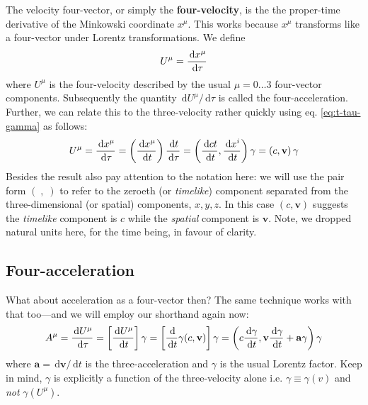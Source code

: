 \documentclass[english,seminar]{lecture}
\newcommand{\diff}{\,\textrm{d}}
\begin{document}
The velocity four-vector, or simply the \textbf{four-velocity}, is the the proper-time derivative of the Minkowski coordinate $x^\mu$. This works because $x^\mu$ transforms like a four-vector under Lorentz transformations. We define
\begin{equation}
	U^\mu = {\diff x^\mu \over \diff \tau} \label{eq:4-velocity}
\end{equation}%
where $U^\mu$ is the four-velocity described by the usual $\mu = 0 \ldots 3$ four-vector components. Subsequently the quantity $\diff U^\mu / \diff \tau$ is called the four-acceleration. Further, we can relate this to the three-velocity rather quickly using eq. \eqref{eq:t-tau-gamma} as follows:
\begin{equation}
U^\mu = {\diff x^\mu \over \diff \tau} = \left( {\diff x^\mu \over \diff t} \right) {\diff t \over \diff \tau} = \left( {\diff ct\over\diff t}, {\diff x^i\over\diff t}\right) \gamma = \left(c,\mathbf{v}\right) \gamma \label{eq:four-velocity}
\end{equation}
Besides the result also pay attention to the notation here: we will use the pair form $(\; , \; )$ to refer to the zeroeth (or \textit{timelike}) component separated from the three-dimensional (or spatial) components, $x, y, z$. In this case $(c,\mathbf{v})$ suggests the \textit{timelike} component is $c$ while the \textit{spatial} component is $\mathbf{v}$. Note, we dropped natural units here, for the time being, in favour of clarity.

\subsection{Four-acceleration}

What about acceleration as a four-vector then? The same technique works with that too---and we will employ our shorthand again now:
\[
A^\mu = {\diff U^\mu \over \diff \tau} = \left[ {\diff U^\mu \over \diff t} \right] \gamma = \left[ {\diff \over \diff t} \gamma (c, \mathbf{v}) \right] \gamma = \left( c{\diff \gamma \over \diff t}, \mathbf{v} {\diff \gamma \over \diff t} + \mathbf{a} \gamma \right) \gamma
\]
where $\mathbf{a} = \diff \mathbf{v} / \diff t$ is the three-acceleration and $\gamma$ is the usual Lorentz factor. Keep in mind, $\gamma$ is explicitly a function of the three-velocity alone i.e. $\gamma \equiv \gamma (v)$ and \textit{not} $\gamma (U^\mu)$.
\end{document}
